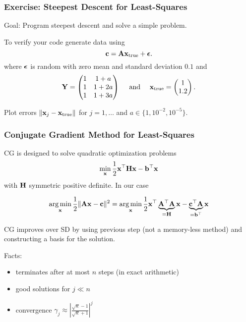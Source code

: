 \documentclass[12pt,fleqn,handout]{beamer}
\begin{document}
\begin{frame}\frametitle{Exercise: Steepest Descent for Least-Squares}

Goal: Program steepest descent and solve a simple problem.

\bigskip

To verify your code generate data using
$$ {\bf c} = {\bf A} {\bf x}_{\rm true} + {\boldsymbol \epsilon}. $$
where ${\boldsymbol \epsilon}$ is random with zero mean and standard deviation $0.1$ and
$$
 {\bf Y} = \begin{pmatrix}  1 & 1+a \\ 1 & 1+2a \\ 1 & 1+3a
	\end{pmatrix} 
	\quad  \text{ and } \quad
	 {\bf x}_{\rm true} = \begin{pmatrix} 1\\ 1.2 \end{pmatrix}.
$$

\bigskip

Plot errors $\|{\bf x}_j - {\bf x}_{\rm true}\|$ for $j=1,\dots$ and $a \in \{1, 10^{-2}, 10^{-5}\}$.

\end{frame}



\begin{frame}\frametitle{Conjugate Gradient Method for Least-Squares}

CG is designed to solve quadratic optimization problems 
$$\min_{\bf x} {\frac 12} {\bf x}^{\top} {\bf H} {\bf x} - {\bf b}^{\top} {\bf x}$$
with ${\bf H}$ symmetric positive definite. In our case

$$ \operatorname*{arg\,min}_{\bf x} {\frac 12} \|{\bf A}{\bf x} - {\bf c}\|^2 = \operatorname*{arg\,min}_{\bf x} {\frac 12} {\bf x}^{\top} \underbrace{{\bf A}^{\top}{\bf A}}_{={\bf H}} {\bf x} - \underbrace{{\bf c}^{\top}{\bf A}}_{={\bf b}^\top}{\bf x} $$

\bigskip
 

CG improves over SD by using previous step (not a memory-less method) and constructing a basis for the solution.

\bigskip

Facts:
\begin{itemize}
	\item terminates after at most $n$ steps (in exact arithmetic)
	\item good solutions for $j\ll n$ 
	\item convergence
	$ \gamma_j \approx \left| {\frac {\sqrt{\kappa}-1}{\sqrt{\kappa}+1}} \right|^j $
\end{itemize}


\end{frame}
\end{document}
